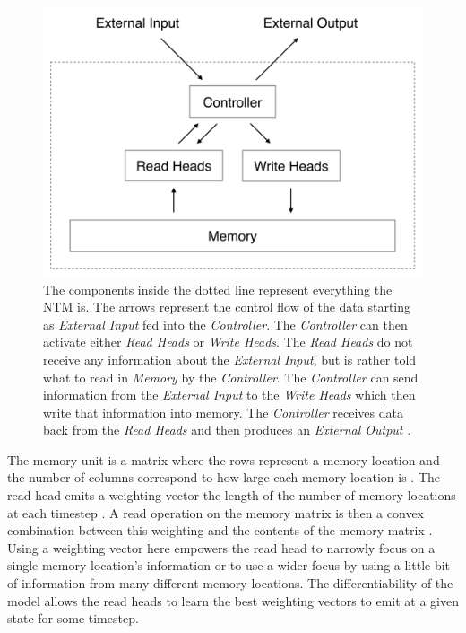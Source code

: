 \begin{figure}[!htb]
    \centering
    \includegraphics[width=0.9\linewidth]{resources/NTM.png}
    \caption{
        The components inside the dotted line represent everything the NTM
        is. The arrows represent the control flow of the data starting
        as \textit{External Input} fed into the \textit{Controller}. The
        \textit{Controller} can then activate either \textit{Read Heads} or
        \textit{Write Heads}. The \textit{Read Heads} do not receive any
        information about the \textit{External Input}, but is rather told what
        to read in \textit{Memory} by the \textit{Controller}. The
        \textit{Controller} can send information from the
        \textit{External Input} to the \textit{Write Heads} which then
        write that information into memory. The \textit{Controller} receives
        data back from the \textit{Read Heads} and then produces an
        \textit{External Output} \cite{DBLP:journals/corr/GravesWD14}.
    }
    \label{fig:NTMArchitecture}
\end{figure}

The memory unit is a matrix where the rows represent a memory location and the
number of columns correspond to how large each memory location is
\cite{DBLP:journals/corr/GravesWD14}. The read head emits a weighting vector
the length of the number of memory locations at each timestep
\cite{DBLP:journals/corr/GravesWD14}. A read operation on the memory matrix
is then a convex combination between this weighting and the contents of the
memory matrix \cite{DBLP:journals/corr/GravesWD14}. Using a weighting vector
here empowers the read head to narrowly focus on a single memory location's
information or to use a wider focus by using a little bit of information
from many different memory locations. The differentiability of the model allows
the read heads to learn the best weighting vectors to emit at a given state for
some timestep.

